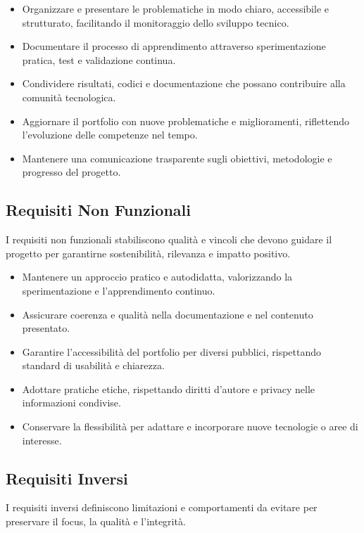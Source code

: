 \documentclass[10pt, a4paper, oneside]{article}
\begin{document}
\begin{itemize}
    \item Organizzare e presentare le problematiche in modo chiaro, accessibile e strutturato, facilitando il monitoraggio dello sviluppo tecnico.
    \item Documentare il processo di apprendimento attraverso sperimentazione pratica, test e validazione continua.
    \item Condividere risultati, codici e documentazione che possano contribuire alla comunità tecnologica.
    \item Aggiornare il portfolio con nuove problematiche e miglioramenti, riflettendo l’evoluzione delle competenze nel tempo.
    \item Mantenere una comunicazione trasparente sugli obiettivi, metodologie e progresso del progetto.
\end{itemize}

\subsection{Requisiti Non Funzionali}

I requisiti non funzionali stabiliscono qualità e vincoli che devono guidare il progetto per garantirne sostenibilità, rilevanza e impatto positivo.

\begin{itemize}
    \item Mantenere un approccio pratico e autodidatta, valorizzando la sperimentazione e l’apprendimento continuo.
    \item Assicurare coerenza e qualità nella documentazione e nel contenuto presentato.
    \item Garantire l’accessibilità del portfolio per diversi pubblici, rispettando standard di usabilità e chiarezza.
    \item Adottare pratiche etiche, rispettando diritti d’autore e privacy nelle informazioni condivise.
    \item Conservare la flessibilità per adattare e incorporare nuove tecnologie o aree di interesse.
\end{itemize}

\subsection{Requisiti Inversi}

I requisiti inversi definiscono limitazioni e comportamenti da evitare per preservare il focus, la qualità e l’integrità.
\end{document}
